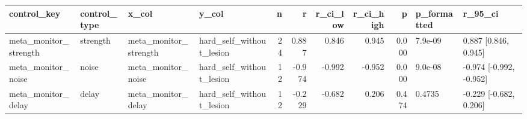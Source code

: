 \begin{tabular}{llllrrrrrll}
\toprule
control_key & control_type & x_col & y_col & n & r & r_ci_low & r_ci_high & p & p_formatted & r_95_ci \\
\midrule
meta_monitor_strength & strength & meta_monitor_strength & hard_self_without_lesion & 24 & 0.887 & 0.846 & 0.945 & 0.000 & 7.9e-09 & 0.887 [0.846, 0.945] \\
meta_monitor_noise & noise & meta_monitor_noise & hard_self_without_lesion & 12 & -0.974 & -0.992 & -0.952 & 0.000 & 9.0e-08 & -0.974 [-0.992, -0.952] \\
meta_monitor_delay & delay & meta_monitor_delay & hard_self_without_lesion & 12 & -0.229 & -0.682 & 0.206 & 0.474 & 0.4735 & -0.229 [-0.682, 0.206] \\
\bottomrule
\end{tabular}
